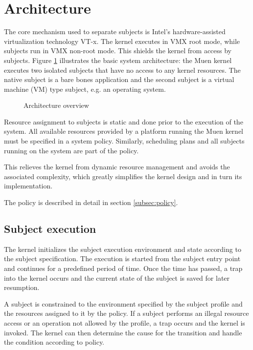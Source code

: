 \section{Architecture}\label{sec:architecture}
The core mechanism used to separate subjects is Intel's hardware-assisted
virtualization technology VT-x. The kernel executes in VMX root mode, while
subjects run in VMX non-root mode. This shields the kernel from access by
subjects. Figure \ref{fig:architecture-overview} illustrates the basic system
architecture: the Muen kernel executes two isolated subjects that have no
access to any kernel resources. The native subject is a bare bones application
and the second subject is a virtual machine (VM) type subject, e.g. an
operating system.

\begin{figure}[h]
	\centering
	
	\caption{Architecture overview}
	\label{fig:architecture-overview}
\end{figure}

Resource assignment to subjects is static and done prior to the execution of
the system. All available resources provided by a platform running the Muen
kernel must be specified in a system policy. Similarly, scheduling plans and
all subjects running on the system are part of the policy.

This relieves the kernel from dynamic resource management and avoids the
associated complexity, which greatly simplifies the kernel design and in turn
its implementation.

The policy is described in detail in section \ref{subsec:policy}.

\subsection{Subject execution}
The kernel initializes the subject execution environment and state according to
the subject specification. The execution is started from the subject entry
point and continues for a predefined period of time. Once the time has passed,
a trap into the kernel occurs and the current state of the subject is saved for
later resumption.

A subject is constrained to the environment specified by the subject profile
and the resources assigned to it by the policy. If a subject performs an
illegal resource access or an operation not allowed by the profile, a trap
occurs and the kernel is invoked. The kernel can then determine the cause for
the transition and handle the condition according to policy.

